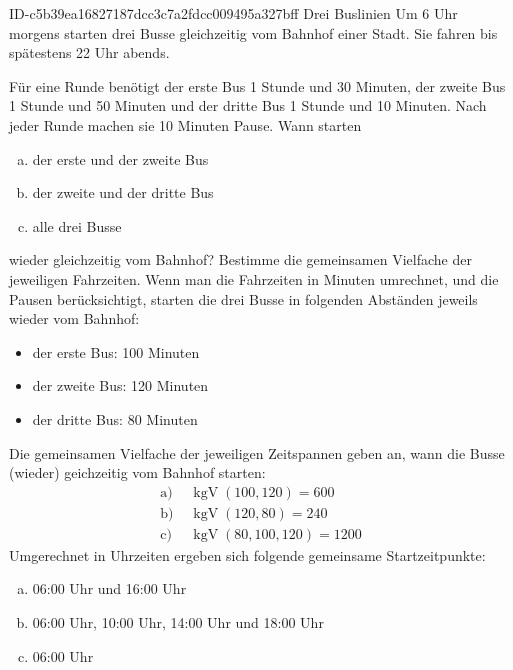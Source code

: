 \begin{exercise}
      {ID-c5b39ea16827187dcc3c7a2fdcc009495a327bff}
      {Drei Buslinien}
  \ifproblem\problem
    Um 6 Uhr morgens starten drei Busse gleichzeitig vom Bahnhof einer Stadt.
    Sie fahren bis spätestens 22 Uhr abends.\par
    Für eine Runde benötigt
    der  erste   Bus 1 Stunde und 30 Minuten,
    der  zweite  Bus 1 Stunde und 50 Minuten und
    der  dritte  Bus 1 Stunde und 10 Minuten.
    Nach jeder Runde machen sie 10 Minuten Pause.
    Wann starten
    \begin{enumerate}[a)]
      \squeeze
      \item der erste und der zweite Bus
      \item der zweite und der dritte Bus
      \item alle drei Busse
    \end{enumerate}
    wieder gleichzeitig vom Bahnhof?
  \fi
  \ifoutline\outline
    Bestimme die gemeinsamen Vielfache der jeweiligen Fahrzeiten.
  \fi
  \ifoutcome\outcome
    Wenn man die Fahrzeiten in Minuten umrechnet, und die Pausen berücksichtigt,
    starten die drei Busse in folgenden Abständen jeweils wieder vom Bahnhof:
    \begin{itemize}
      \squeeze
      \item der erste Bus: 100 Minuten
      \item der zweite Bus: 120 Minuten
      \item der dritte Bus: 80 Minuten
    \end{itemize}
    Die gemeinsamen Vielfache der jeweiligen Zeitspannen geben an,
    wann die Busse (wieder) geichzeitig vom Bahnhof starten:
    \begin{equation*}
      \begin{split}
        \text{a) }&\operatorname{kgV}(100, 120)=600\\
        \text{b) }&\operatorname{kgV}(120, 80)=240\\
        \text{c) }&\operatorname{kgV}(80, 100, 120)=1200
      \end{split}
    \end{equation*}
    Umgerechnet in Uhrzeiten ergeben sich folgende gemeinsame Startzeitpunkte:
    \begin{enumerate}[a)]
      \item {} 06:00 Uhr und 16:00 Uhr
      \item {} 06:00 Uhr, 10:00 Uhr, 14:00 Uhr und 18:00 Uhr
      \item {} 06:00 Uhr
    \end{enumerate}
  \fi
\end{exercise}
